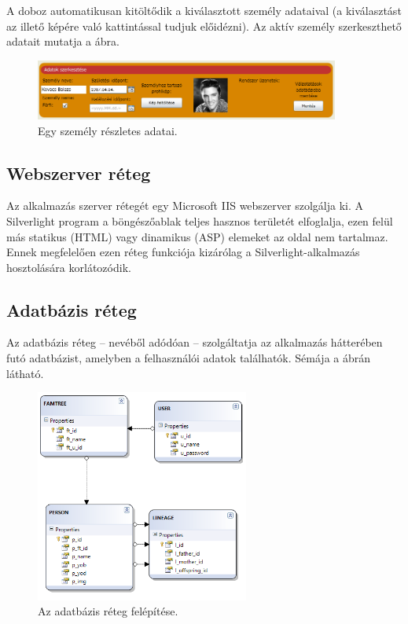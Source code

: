 A doboz automatikusan kitöltődik a kiválasztott személy adataival (a kiválasztást az illető képére való kattintással tudjuk előidézni). Az aktív személy szerkeszthető adatait mutatja a  ábra.

\begin{figure}[!ht]
\centering
\includegraphics[width=100mm, keepaspectratio]{figures/reszletek.png}
\caption{Egy személy részletes adatai.}
\label{fig:alk_edit}
\end{figure}

\subsection{Webszerver réteg}\label{sect:szerver_reteg}

Az alkalmazás szerver rétegét egy Microsoft IIS webszerver szolgálja ki. A Silverlight program a böngészőablak teljes hasznos területét elfoglalja, ezen felül más statikus (HTML) vagy dinamikus (ASP) elemeket az oldal nem tartalmaz. Ennek megfelelően ezen réteg funkciója kizárólag a Silverlight-alkalmazás hosztolására korlátozódik.

\subsection{Adatbázis réteg}\label{sect:adatbazis_reteg}

Az adatbázis réteg -- nevéből adódóan -- szolgáltatja az alkalmazás hátterében futó adatbázist, amelyben a felhasználói adatok találhatók. Sémája a  ábrán látható.

\begin{figure}[!ht]
\centering
\includegraphics[width=70mm, keepaspectratio]{figures/db_sema.png}
\caption{Az adatbázis réteg felépítése.}
\label{fig:db_sema}
\end{figure}

